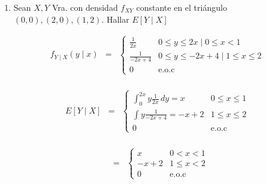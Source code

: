 \begin{enumerate}
\begin{eqnarray*}
 \therefore \prob \left[2X \mid Z \geq 3, X par \right] &=& \sum _{x=4}^{\infty} 2x \frac{3520}{81} \left( \frac{3}{8} \right)^{x}\\
 &=& 2 \left( \frac{3520}{81} \right) \sum _{x=4} ^{\infty} x \left( \frac{3}{8} \right)^{x}\\
 &=& \frac{7040}{81} \left[4 \left( \frac{3}{8} \right)^4 + 6 \left(\frac{3}{8} \right)^6 + \ldots \right]\\
 &=& \frac{14080}{81}\left[ \frac{\frac{9}{64}}{\left(1 - \frac{9}{64} \right)^2} - \frac{9}{64} \right] = \frac{14080}{81} \left[ \frac{9}{64} \left(\frac{4086}{3025} \right)- \frac{9}{64} \right]\\
&=& \left( \frac{14080}{81} \right) \left(\frac{9}{64} \right) \left[\frac{4096}{3025} - 1\right] = \frac{14080}{81} \left(\frac{9}{64} \right)\left( \frac{1071}{3025} \right)= \frac{476}{55}
\end{eqnarray*}




\item
Sean $X,Y$ Vra. con densidad $f_{XY}$ constante en el tri\'angulo $\left(0,0 \right), \left(2,0 \right), \left(1,2 \right)$. Hallar $E \left[ Y \mid X \right]$

\begin{eqnarray*}
f_{Y \mid X} \left( y \mid x \right) &=& \begin{cases}
\frac{1}{2x}  & 0 \leq y \leq 2x \mid 0\leq x < 1 \\
\frac{1}{-2x+4} & 0 \leq y \leq -2x+4  \mid  1\leq x \leq 2\\
0 &  \textrm{e.o.c} 
\end{cases}\\
\end{eqnarray*}

\begin{eqnarray*}
E \left[Y \mid X \right] &=& \begin{cases}
\int_{0}^{2x} y \frac{1}{2x} \,dy= x  & 0\leq x \leq 1\\
\int y \frac{1}{-2x+4}=-x+2 & 1 \leq x \leq 2\\
0 &  \textrm{e.o.c} 
\end{cases}\\
\end{eqnarray*}

\begin{eqnarray*}
 &=& \begin{cases}
x & 0 <x < 1\\
-x+2 & 1 \leq x < 2\\
0 &  \textrm{e.o.c} 
\end{cases}\\
\end{eqnarray*}
\end{enumerate}

